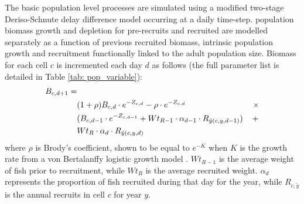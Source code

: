 \documentclass[review]{elsarticle}
\begin{document}
The basic population level processes are simulated using a modified two-stage
Deriso-Schnute delay difference model \citep{Deriso1980, Schnute1985,
	Dichmont2003} occurring at a daily time-step. 
 population
biomass growth and depletion for pre-recruits and
recruited  are modelled
separately as a function of previous recruited biomass, intrinsic population
growth and recruitment functionally linked to the adult population size.
Biomass for each cell $c$ is incremented each day $d$ as follows (the full
parameter list is detailed in Table \ref{tab: pop_variable}): \begin{equation}
	\begin{split}
	B_{c,d+1} = &\\
	& (1 + \rho) B_{c,d} \cdot e^{-Z_{c,d}} - \rho \cdot e^{-Z_{c,d}} \hspace{2.9cm}
	\times \\  
	& (B_{c,d-1} \cdot e^{-Z_{c,d-1}} + Wt_{R-1} \cdot \alpha_{d-1} \cdot
	R_{\tilde{y}(c,y,d-1)})
	\hspace{0.4cm} + \\
	& Wt_{R} \cdot \alpha_{d} \cdot R_{\tilde{y}(c,y,d)} 
	\end{split}
\end{equation}
where $\rho$ is Brody's coefficient, shown to be equal to $e^{-K}$ when $K$ is
the growth rate from a von Bertalanffy logistic growth model
\citep{Schnute1985}. $Wt_{R-1}$ is the average weight of fish prior to
recruitment, while $Wt_{R}$ is the average recruited weight. $\alpha_{d}$
represents the proportion of fish recruited during that day for the year, while
$R_{c,\tilde{y}}$ is the annual recruits in cell $c$ for year $y$. \\
\end{document}
